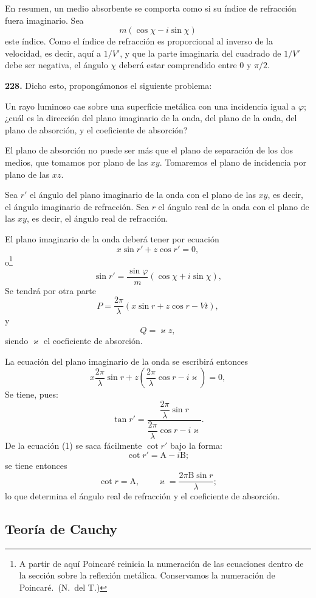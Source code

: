 En resumen, un medio absorbente se comporta como si su índice de
refracción fuera imaginario. Sea
\[
m(\cos\chi-i\sin\chi)
\]
este índice. Como el índice de refracción es proporcional al inverso de
la velocidad, es decir, aquí a $1/V'$, y que la parte imaginaria del
cuadrado de $1/V'$ debe ser negativa, el ángulo $\chi$ deberá estar
comprendido entre $0$ y $\pi/2$.

\noindent\textbf{228.} Dicho esto, propongámonos el siguiente problema:

Un rayo luminoso cae sobre una superficie metálica con una incidencia
igual a $\varphi$; ¿cuál es la dirección del plano imaginario de la
onda, del plano de la onda, del plano de absorción, y el coeficiente de
absorción?

El plano de absorción no puede ser más que el plano de separación de los
dos medios, que tomamos por plano de las $xy$. Tomaremos el plano de
incidencia por plano de las $xz$.

Sea $r'$ el ángulo del plano imaginario de la onda con el plano de las
$xy$, es decir, el ángulo imaginario de refracción. Sea $r$ el ángulo
real de la onda con el plano de las $xy$, es decir, el ángulo real de
refracción.

El plano imaginario de la onda deberá tener por ecuación
\[
x\sin r'+z\cos r'=0,
\]
o\footnote{A partir de aquí Poincaré reinicia la numeración de las
ecuaciones dentro de la sección sobre la reflexión metálica. Conservamos
la numeración de Poincaré.~(N.~del T.)}
\setcounter{equation}{0}
\begin{equation}
\sin r'=\frac{\sin\varphi}{m}(\cos\chi+i\sin\chi),
\end{equation}
Se tendrá por otra parte
\[
P=\frac{2\pi}{\lambda}(x\sin r+z\cos r-Vt),
\]
y
\[
Q=\varkappa z,
\]
siendo $\varkappa$ el coeficiente de absorción.

La ecuación del plano imaginario de la onda se escribirá entonces
\[
x\frac{2\pi}{\lambda}\sin r+z\left(\frac{2\pi}{\lambda}\cos r-i\varkappa\right)=0,
\]
Se tiene, pues:
\[
\tan r'=\dfrac{\dfrac{2\pi}{\lambda}\sin r}{\dfrac{2\pi}{\lambda}\cos r-i\varkappa}.
\]
De la ecuación (1) se saca fácilmente $\cot r'$ bajo la forma:
\[
\cot r'=\mathrm{A}-i\mathrm{B};
\]
se tiene entonces
\[
\cot r=\mathrm{A},\qquad \varkappa=\frac{2\pi\mathrm{B}\sin r}{\lambda};
\]
lo que determina el ángulo real de refracción y el coeficiente de
absorción.

\subsection{Teoría de Cauchy}
\label{sec:reflexion-metalica-cauchy}

